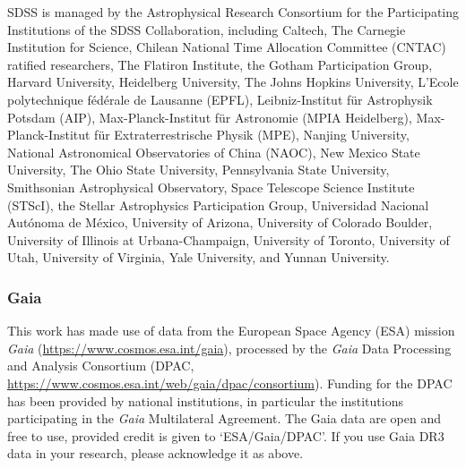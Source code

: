 \documentclass[]{polymathic}
\begin{document}
SDSS is managed by the Astrophysical Research Consortium for the Participating Institutions of the SDSS Collaboration, including Caltech, The Carnegie Institution for Science, Chilean National Time Allocation Committee (CNTAC) ratified researchers, The Flatiron Institute, the Gotham Participation Group, Harvard University, Heidelberg University, The Johns Hopkins University, L'Ecole polytechnique f\'{e}d\'{e}rale de Lausanne (EPFL), Leibniz-Institut f\"{u}r Astrophysik Potsdam (AIP), Max-Planck-Institut f\"{u}r Astronomie (MPIA Heidelberg), Max-Planck-Institut f\"{u}r Extraterrestrische Physik (MPE), Nanjing University, National Astronomical Observatories of China (NAOC), New Mexico State University, The Ohio State University, Pennsylvania State University, Smithsonian Astrophysical Observatory, Space Telescope Science Institute (STScI), the Stellar Astrophysics Participation Group, Universidad Nacional Aut\'{o}noma de M\'{e}xico, University of Arizona, University of Colorado Boulder, University of Illinois at Urbana-Champaign, University of Toronto, University of Utah, University of Virginia, Yale University, and Yunnan University.

\subsubsection{Gaia}
This work has made use of data from the European Space Agency (ESA) mission {\it Gaia} (\url{https://www.cosmos.esa.int/gaia}), processed by the {\it Gaia} Data Processing and Analysis Consortium (DPAC, \url{https://www.cosmos.esa.int/web/gaia/dpac/consortium}). Funding for the DPAC has been provided by national institutions, in particular the institutions participating in the {\it Gaia} Multilateral Agreement. The Gaia data are open and free to use, provided credit is given to `ESA/Gaia/DPAC'. If you use Gaia DR3 data in your research, please acknowledge it as above.










\end{document}

